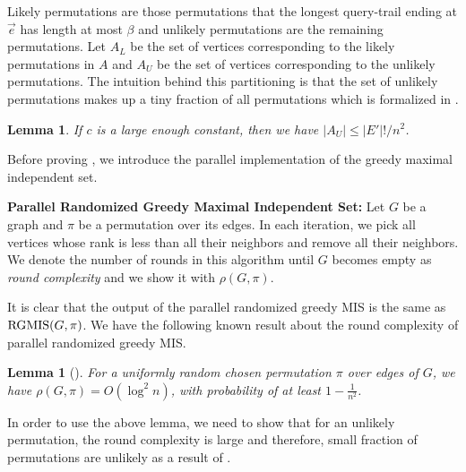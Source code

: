 \documentclass[letterpaper,11pt]{article}
\newcommand{\RGMIS}[0]{\ensuremath{\textup{RGMIS}}}
\newtheorem{lemma}[theorem]{Lemma}
\begin{document}
Likely permutations are those permutations that the longest query-trail ending at $\vec{e}$ has length at most $\beta$ and unlikely permutations are the remaining permutations. Let $A_L$ be the set of vertices corresponding to the likely permutations in $A$ and $A_U$ be the set of vertices corresponding to the unlikely permutations. The intuition behind this partitioning is that the set of unlikely permutations makes up a tiny fraction of all permutations which is formalized in .

\begin{lemma}\label{lem: few-long-trail}
If $c$ is a large enough constant, then we have $|A_U| \leq |E'|! / n^2$.
\end{lemma}

Before proving , we introduce the parallel implementation of the greedy maximal independent set.

\noindent\textbf{Parallel Randomized Greedy Maximal Independent Set:} Let $G$ be a graph and $\pi$ be a permutation over its edges. In each iteration, we pick all vertices whose rank is less than all their neighbors and remove all their neighbors. We denote the number of rounds in this algorithm until $G$ becomes empty as \textit{round complexity} and we show it with $\rho(G, \pi)$.

It is clear that the output of the parallel randomized greedy MIS is the same as $\RGMIS(G, \pi)$. We have the following known result about the round complexity of parallel randomized greedy MIS.


\begin{lemma}[{\cite[Theorem~3.5]{Blelloch12}}]\label{lem: parallel-RMGIS-rounds}
For a uniformly random chosen permutation $\pi$ over edges of $G$, we have $\rho(G, \pi) = O(\log^2 n)$, with probability of at least $1 - \frac{1}{n^2}$.
\end{lemma}


In order to use the above lemma, we need to show that for an unlikely permutation, the round complexity is large and therefore, small fraction of permutations are unlikely as a result of .
\end{document}
